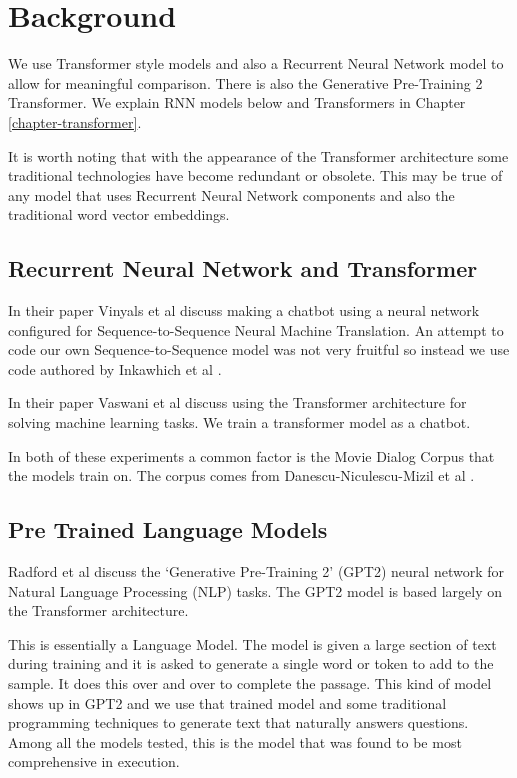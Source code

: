 \section{Background}
We use Transformer style models and also a Recurrent Neural Network model to allow for meaningful comparison. There is also the Generative Pre-Training 2 Transformer. We explain RNN models below and Transformers in Chapter \ref{chapter-transformer}.

It is worth noting that with the appearance of the Transformer architecture some traditional technologies have become redundant or obsolete. This may be true of any model that uses Recurrent Neural Network components and also the traditional word vector embeddings.

\subsection{Recurrent Neural Network and Transformer}

In their paper Vinyals et al \cite{DBLP:journals/corr/VinyalsL15} discuss making a chatbot using a neural network configured for Sequence-to-Sequence Neural Machine Translation. An attempt to code our own Sequence-to-Sequence model was not very fruitful so instead we use code authored by Inkawhich et al \cite{2018Inkawhich}.

In their paper Vaswani et al \cite{Vaswani2017AttentionIA} discuss using the Transformer architecture for solving machine learning tasks. We train a transformer model as a chatbot.

In both of these experiments a common factor is the Movie Dialog Corpus that the models train on. The corpus comes from Danescu-Niculescu-Mizil et al \cite{Danescu-Niculescu-Mizil+Lee:11a}.

\subsection{Pre Trained Language Models}
Radford et al \cite{radford2019language} discuss the `Generative Pre-Training 2' (GPT2) neural network for Natural Language Processing (\ac{NLP}) tasks. The GPT2 model is based largely on the Transformer architecture. 

This is essentially a Language Model. The model is given a large section of text during training and it is asked to generate a single word or token to add to the sample. It does this over and over to complete the passage. This kind of model shows up in GPT2 and we use that trained model and some traditional programming techniques to generate text that naturally answers questions. Among all the models tested, this is the model that was found to be most comprehensive in execution.

